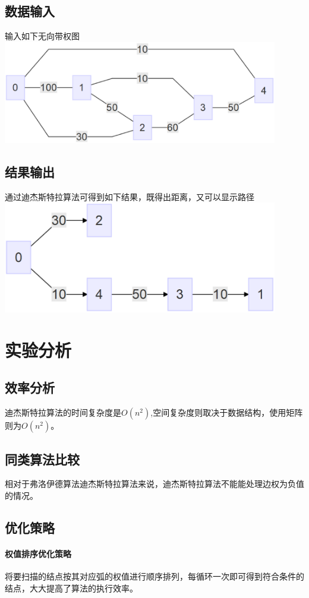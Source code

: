 \documentclass[a4paper,10pt]{ctexart}
\begin{document}
\subsection{数据输入}
输入如下无向带权图\\
\includegraphics[width=0.9\textwidth]{../Pics/Test-MinLen.eps}
\subsection{结果输出}
通过迪杰斯特拉算法可得到如下结果，既得出距离，又可以显示路径\\
\includegraphics[width=0.9\textwidth]{../Pics/Test-MinLen-out.eps}

\section{实验分析}
\subsection{效率分析}
迪杰斯特拉算法的时间复杂度是$O(n^2)$,空间复杂度则取决于数据结构，使用矩阵则为$O(n^2)$。
\subsection{同类算法比较}
相对于弗洛伊德算法迪杰斯特拉算法来说，迪杰斯特拉算法不能能处理边权为负值的情况。
\subsection{优化策略}
\paragraph{权值排序优化策略}
将要扫描的结点按其对应弧的权值进行顺序排列，每循环一次即可得到符合条件的结点，大大提高了算法的执行效率。
\end{document}
